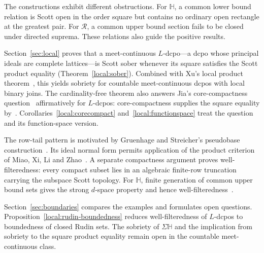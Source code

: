 \documentclass[10pt,a4paper]{article}
\theoremstyle{definition}
\newcommand{\HH}{\mathbb H}
\newcommand{\RR}{\mathcal R}
\begin{document}
The constructions exhibit different obstructions. For $\HH$, a common lower bound relation is Scott open in the order square but contains no ordinary open rectangle at the greatest pair. For $\RR$, a common upper bound section fails to be closed under directed suprema. These relations also guide the positive results.

Section~\ref{sec:local} proves that a meet-continuous $L$-dcpo---a dcpo whose principal ideals are complete lattices---is Scott sober whenever its square satisfies the Scott product equality (Theorem~\ref{local:sober}). Combined with Xu's local product theorem~\cite[Theorem~3.4]{Xu}, this yields sobriety for countable meet-continuous dcpos with local binary joins. The cardinality-free theorem also answers Jia's core-compactness question~\cite[Question~4.5.8, p.~139]{Jia} affirmatively for $L$-dcpos: core-compactness supplies the square equality by~\cite[Theorem~II-4.13]{GHK}. Corollaries~\ref{local:corecompact} and~\ref{local:functionspace} treat the question and its function-space version.

The row-tail pattern is motivated by Gruenhage and Streicher's pseudobase construction~\cite[pp.~225--226]{GS}. Its ideal normal form permits application of the product criterion of Miao, Xi, Li and Zhao~\cite[Lemma~4.1, pp.~827--829]{MXLZ}. A separate compactness argument proves well-filteredness: every compact subset lies in an algebraic finite-row truncation carrying the subspace Scott topology. For $\HH$, finite generation of common upper bound sets gives the strong $d$-space property and hence well-filteredness~\cite[Corollary~64]{LXLower}.

Section~\ref{sec:boundaries} compares the examples and formulates open questions. Proposition~\ref{local:rudin-boundedness} reduces well-filteredness of $L$-dcpos to boundedness of closed Rudin sets. The sobriety of $\Sigma\HH$ and the implication from sobriety to the square product equality remain open in the countable meet-continuous class.
\end{document}
